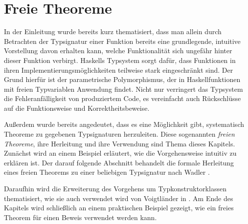 \section{Freie Theoreme}

\label{sec:freie-theoreme}

In der Einleitung wurde bereits kurz thematisiert, dass man allein durch Betrachten der Typsignatur einer Funktion bereits
eine grundlegende, intuitive Vorstellung davon erhalten kann, welche Funktionalität sich ungefähr hinter dieser Funktion
verbirgt. Haskells Typsystem sorgt dafür, dass Funktionen in ihren Implementierungsmöglichkeiten
teilweise stark eingeschränkt sind. Der Grund hierfür ist der parametrische Polymorphismus, der in Haskellfunktionen
mit freien Typvariablen Anwendung findet. Nicht nur verringert das Typsystem die Fehleranfälligkeit von produziertem
Code, es vereinfacht auch Rückschlüsse auf die Funktionsweise und Korrektheitsbeweise.

Außerdem wurde bereits angedeutet, dass es eine Möglichkeit gibt, systematisch Theoreme zu gegebenen Typsignaturen
herzuleiten. Diese sogenannten \textit{freien Theoreme}, ihre Herleitung und ihre Verwendung sind Thema dieses Kapitels.
Zunächst wird an einem Beispiel
erläutert, wie die Vorgehensweise intuitiv zu erklären ist. Der darauf folgende Abschnitt behandelt die formale Herleitung
eines freien Theorems zu einer beliebigen Typsignatur nach Wadler \cite{wadler}.

Daraufhin wird die Erweiterung des Vorgehens um Typkonstruktorklassen thematisiert, wie sie
auch verwendet wird von Voigtländer in \cite{voigtlander}. Am Ende des Kapitels wird schließlich an einem
praktischen Beispiel gezeigt, wie ein freies Theorem für einen Beweis verwendet werden kann.




